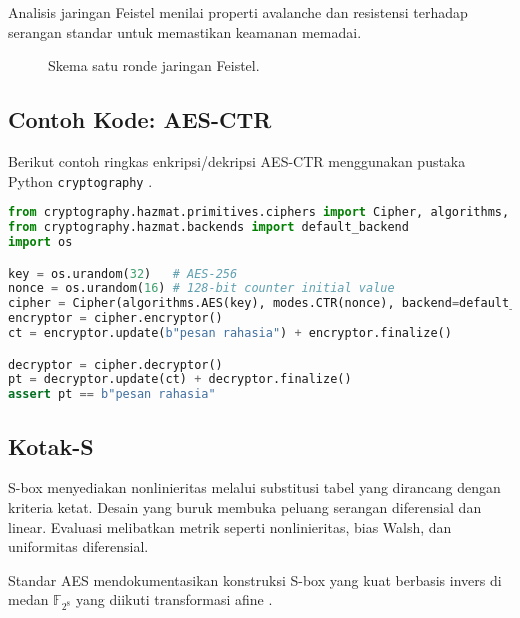 \documentclass[../main.tex]{subfiles}
\begin{document}
Analisis jaringan Feistel menilai properti avalanche dan resistensi terhadap serangan standar untuk memastikan keamanan memadai.

\begin{figure}[h]
\centering
{}
\caption{Skema satu ronde jaringan Feistel.}
\label{fig:feistel}
\end{figure}

\subsection{Contoh Kode: AES-CTR}
Berikut contoh ringkas enkripsi/dekripsi AES-CTR menggunakan pustaka Python \texttt{cryptography} \parencite{cryptography-symmetric-docs}.

\begin{lstlisting}[language=Python, caption={AES-CTR dengan cryptography}, label={lst:aesctr}]
from cryptography.hazmat.primitives.ciphers import Cipher, algorithms, modes
from cryptography.hazmat.backends import default_backend
import os

key = os.urandom(32)   # AES-256
nonce = os.urandom(16) # 128-bit counter initial value
cipher = Cipher(algorithms.AES(key), modes.CTR(nonce), backend=default_backend())
encryptor = cipher.encryptor()
ct = encryptor.update(b"pesan rahasia") + encryptor.finalize()

decryptor = cipher.decryptor()
pt = decryptor.update(ct) + decryptor.finalize()
assert pt == b"pesan rahasia"
\end{lstlisting}

\subsection{Kotak-S}
S-box menyediakan nonlinieritas melalui substitusi tabel yang dirancang dengan kriteria ketat. Desain yang buruk membuka peluang serangan diferensial dan linear. Evaluasi melibatkan metrik seperti nonlinieritas, bias Walsh, dan uniformitas diferensial.

Standar AES mendokumentasikan konstruksi S-box yang kuat berbasis invers di medan \(\mathbb{F}_{2^8}\) yang diikuti transformasi afine \parencite{fips197}.
\end{document}
